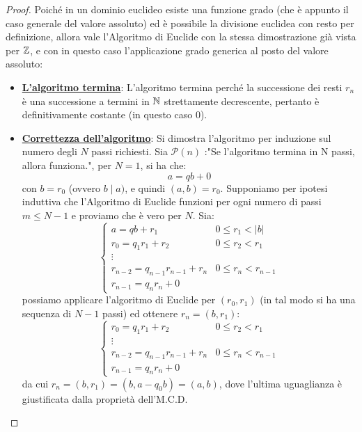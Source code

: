 \documentclass[11pt]{scrartcl}
\begin{document}
\begin{proof}
    Poiché in un dominio euclideo esiste una funzione grado (che è appunto il caso generale del valore assoluto) ed è possibile la divisione euclidea con resto per definizione,
    allora vale l'Algoritmo di Euclide con la stessa dimostrazione già vista per $\mathbb Z$, e con in questo caso l'applicazione grado generica al posto del valore assoluto:
    \begin{itemize}
        \item \underline{\textbf{L'algoritmo termina}}: L'algoritmo termina perché la successione dei resti $r_n$ è una successione a termini
         in $\mathbb N$ strettamente decrescente, pertanto è definitivamente costante (in questo caso 0).\\
         \item \underline{\textbf{Correttezza dell'algoritmo}}: Si dimostra l'algoritmo per induzione sul numero degli $N$ passi richiesti.
         Sia $\mathcal{P}(n)$ :"Se l'algoritmo termina in N passi, allora funziona.", per $N = 1$, si ha che:
             \[ a = qb + 0
                 \]
         con $b = r_0$ (ovvero $b \mid a)$, e quindi $(a,b) = r_0$. Supponiamo per ipotesi induttiva che l'Algoritmo di 
         Euclide funzioni per ogni numero di passi $m \leq N - 1$ e proviamo che è vero per $N$. Sia:
             \[ \begin{cases}
                 a = qb + r_1 & 0 \leq r_1 < |b| \\
                 r_0 = q_1r_1 + r_2 & 0 \leq r_2 < r_1 \\
                 \vdots \\
                 r_{n-2} = q_{n-1}r_{n-1} + r_n & 0 \leq r_n < r_{n-1} \\
                 r_{n-1} = q_nr_n + 0
             \end{cases}
                 \]
         possiamo applicare l'algoritmo di Euclide per $(r_0,r_1)$ (in tal modo si ha una sequenza di $N - 1$ passi) ed ottenere
         $r_n = (b, r_1)$:
             \[\begin{cases}
                 r_0 = q_1r_1 + r_2 & 0 \leq r_2 < r_1 \\
                 \vdots \\
                 r_{n-2} = q_{n-1}r_{n-1} + r_n & 0 \leq r_n < r_{n-1} \\
                 r_{n-1} = q_nr_n + 0
             \end{cases}
                 \]
         da cui $r_n = (b,r_1) = (b, a - q_0b) = (a,b)$, dove l'ultima uguaglianza è giustificata dalla proprietà dell'M.C.D.
    \end{itemize}
\end{proof}
\end{document}

